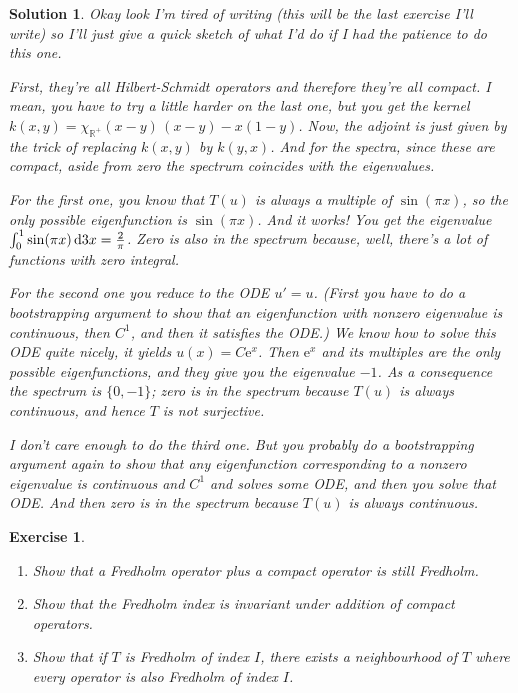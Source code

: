 \documentclass{article}
\newtheorem{ex}{Exercise}
\theoremstyle{nonumberplain}
\newtheorem{sol}{Solution}
\newcommand{\R}{\mathbb{R}}
\newcommand{\e}{\mathrm{e}}
\begin{document}
\begin{sol}
Okay look I'm tired of writing (this will be the last exercise I'll write) so I'll just give a quick sketch of what I'd do if I had the patience to do this one.

First, they're all Hilbert-Schmidt operators and therefore they're all compact. I mean, you have to try a little harder on the last one, but you get the kernel $k(x,y) = \chi_{\R^+}(x-y)\,(x-y) - x(1-y)$. Now, the adjoint is just given by the trick of replacing $k(x,y)$ by $k(y,x)$. And for the spectra, since these are compact, aside from zero the spectrum coincides with the eigenvalues.

For the first one, you know that $T(u)$ is always a multiple of $\sin(\pi x)$, so the only possible eigenfunction is $\sin(\pi x)$. And it works! You get the eigenvalue $\int_0^1 \sin(\pi x)\dl3 x = \frac2\pi$. Zero is also in the spectrum because, well, there's a lot of functions with zero integral.

For the second one you reduce to the ODE $u' = u$. (First you have to do a bootstrapping argument to show that an eigenfunction with nonzero eigenvalue is continuous, then $C^1$, and then it satisfies the ODE.) We know how to solve this ODE quite nicely, it yields $u(x) = C \e^x$. Then $\e^x$ and its multiples are the only possible eigenfunctions, and they give you the eigenvalue $-1$. As a consequence the spectrum is $\{0,-1\}$; zero is in the spectrum because $T(u)$ is always continuous, and hence $T$ is not surjective.

I don't care enough to do the third one. But you probably do a bootstrapping argument again to show that any eigenfunction corresponding to a nonzero eigenvalue is continuous and $C^1$ and solves some ODE, and then you solve that ODE. And then zero is in the spectrum because $T(u)$ is always continuous.
\end{sol}

\begin{ex}
\leavevmode
\begin{enumerate}
\item Show that a Fredholm operator plus a compact operator is still Fredholm.
\item Show that the Fredholm index is invariant under addition of compact operators.
\item Show that if $T$ is Fredholm of index $I$, there exists a neighbourhood of $T$ where every operator is also Fredholm of index $I$.
\end{enumerate}
\end{ex}
\end{document}
